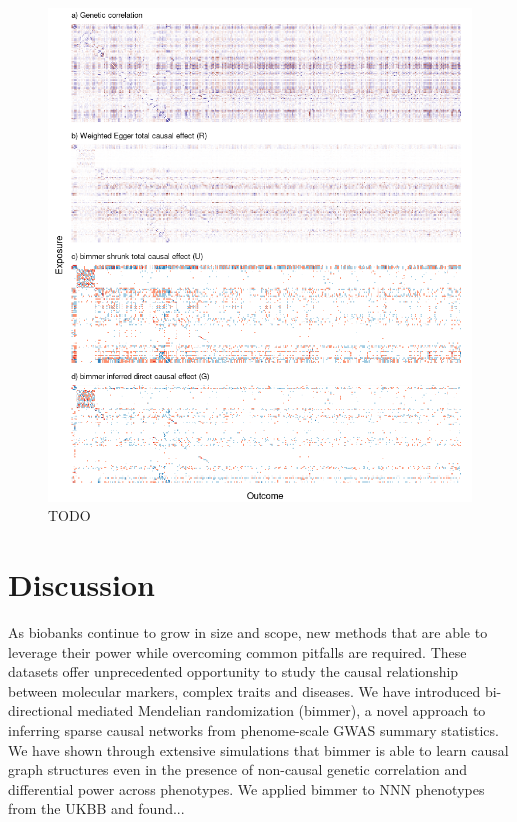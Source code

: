 \documentclass{article}
\begin{document}
\begin{figure}\label{figure5}
\includegraphics[width=\textwidth]{figures/figure5.png}
\caption{TODO}
\end{figure}



\section{Discussion}\label{discussion}
As biobanks continue to grow in size and scope, new methods that are able to
leverage their power while overcoming common pitfalls are required.
These datasets offer unprecedented opportunity to study
the causal relationship between molecular markers, complex traits and diseases.
We have introduced bi-directional mediated Mendelian randomization (bimmer),
a novel approach to inferring sparse causal networks from phenome-scale
GWAS summary statistics. We have shown through extensive simulations that
bimmer is able to learn causal graph structures even in the presence of non-causal genetic
correlation and differential power across phenotypes. We applied bimmer to 
NNN phenotypes from the UKBB and found...
\end{document}
